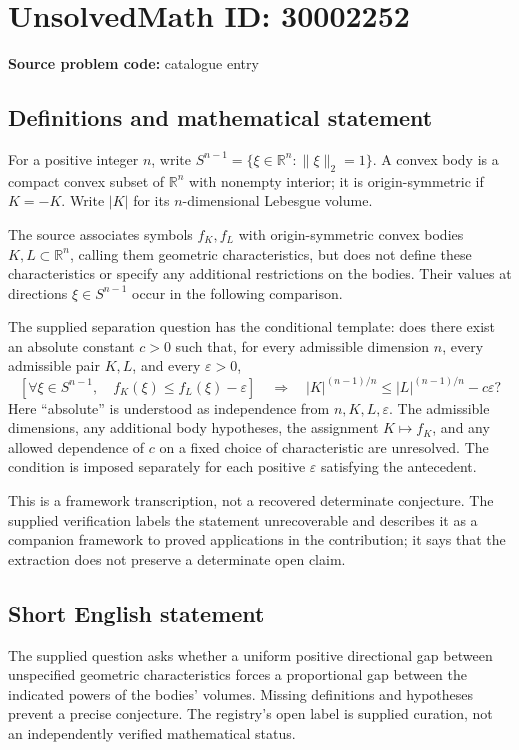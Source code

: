 \documentclass[11pt]{article}
\newcommand{\R}{\mathbb{R}}
\begin{document}
\section*{UnsolvedMath ID: 30002252}
\textbf{Source problem code:} catalogue entry
\subsection{Definitions and mathematical statement}
For a positive integer \(n\), write \(S^{n-1}=\{\xi\in\R^n:\|\xi\|_2=1\}\). A convex body is a compact convex subset of \(\R^n\) with nonempty interior; it is origin-symmetric if \(K=-K\). Write \(|K|\) for its \(n\)-dimensional Lebesgue volume.

The source associates symbols \(f_K,f_L\) with origin-symmetric convex bodies \(K,L\subset\R^n\), calling them geometric characteristics, but does not define these characteristics or specify any additional restrictions on the bodies. Their values at directions \(\xi\in S^{n-1}\) occur in the following comparison.

The supplied separation question has the conditional template: does there exist an absolute constant \(c>0\) such that, for every admissible dimension \(n\), every admissible pair \(K,L\), and every \(\varepsilon>0\),
\[
\left[\forall\xi\in S^{n-1},\quad f_K(\xi)\leq f_L(\xi)-\varepsilon\right]
\quad\Longrightarrow\quad
|K|^{(n-1)/n}\leq |L|^{(n-1)/n}-c\varepsilon?
\]
Here ``absolute'' is understood as independence from \(n,K,L,\varepsilon\). The admissible dimensions, any additional body hypotheses, the assignment \(K\mapsto f_K\), and any allowed dependence of \(c\) on a fixed choice of characteristic are unresolved. The condition is imposed separately for each positive \(\varepsilon\) satisfying the antecedent.

This is a framework transcription, not a recovered determinate conjecture. The supplied verification labels the statement unrecoverable and describes it as a companion framework to proved applications in the contribution; it says that the extraction does not preserve a determinate open claim.
\subsection{Short English statement}
The supplied question asks whether a uniform positive directional gap between unspecified geometric characteristics forces a proportional gap between the indicated powers of the bodies' volumes. Missing definitions and hypotheses prevent a precise conjecture. The registry's open label is supplied curation, not an independently verified mathematical status.
\end{document}
